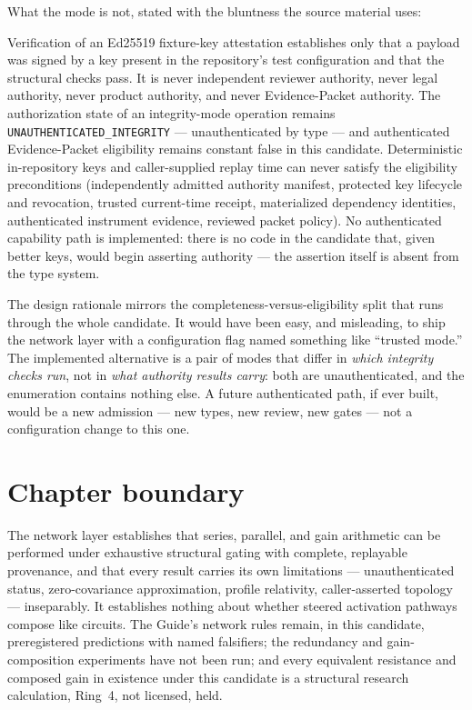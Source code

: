 What the mode is not, stated with the bluntness the source material uses:

\begin{ruleenv}\label{ch09:rule:fixture}
Verification of an Ed25519 fixture-key attestation establishes only that
a payload was signed by a key present in the repository's test
configuration and that the structural checks pass. It is never
independent reviewer authority, never legal authority, never product
authority, and never Evidence-Packet authority. The authorization state
of an integrity-mode operation remains
\texttt{UNAUTHENTICATED\_INTEGRITY} --- unauthenticated by type --- and
authenticated Evidence-Packet eligibility remains constant false in this
candidate. Deterministic in-repository keys and caller-supplied replay
time can never satisfy the eligibility preconditions (independently
admitted authority manifest, protected key lifecycle and revocation,
trusted current-time receipt, materialized dependency identities,
authenticated instrument evidence, reviewed packet policy). No
authenticated capability path is implemented: there is no code in the
candidate that, given better keys, would begin asserting authority ---
the assertion itself is absent from the type system.
\end{ruleenv}

The design rationale mirrors the completeness-versus-eligibility split
that runs through the whole candidate. It would have been easy, and
misleading, to ship the network layer with a configuration flag named
something like ``trusted mode.'' The implemented alternative is a pair of
modes that differ in \emph{which integrity checks run}, not in \emph{what
authority results carry}: both are unauthenticated, and the enumeration
contains nothing else. A future authenticated path, if ever built, would
be a new admission --- new types, new review, new gates --- not a
configuration change to this one.

\section{Chapter boundary}\label{ch09:sec:boundary}

\begin{boundary}\label{ch09:bound:networks}
The network layer establishes that series, parallel, and gain arithmetic
can be performed under exhaustive structural gating with complete,
replayable provenance, and that every result carries its own limitations
--- unauthenticated status, zero-covariance approximation, profile
relativity, caller-asserted topology --- inseparably. It establishes
nothing about whether steered activation pathways compose like circuits.
The Guide's network rules remain, in this candidate, preregistered
predictions with named falsifiers; the redundancy and gain-composition
experiments have not been run; and every equivalent resistance and
composed gain in existence under this candidate is a structural research
calculation, Ring~4, not licensed, held.
\end{boundary}
